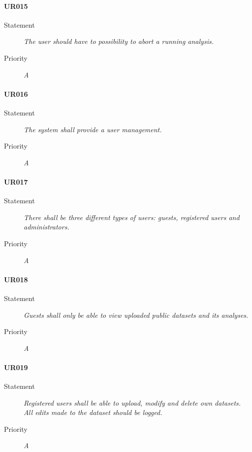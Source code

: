 \paragraph{UR015}
\begin{description}
    \item[Statement]
        \textit{The user should have to possibility to abort a running analysis.}
    \item [Priority] \textit{A}
\end{description}

\paragraph{UR016}
\begin{description}
    \item[Statement]
        \textit{The system shall provide a user management.}
    \item [Priority] \textit{A}
\end{description}

\paragraph{UR017}
\begin{description}
    \item[Statement]
        \textit{There shall be three different types of users: guests, registered users and administrators.}
    \item [Priority] \textit{A}
\end{description}

\paragraph{UR018}
\begin{description}
    \item[Statement]
        \textit{Guests shall only be able to view uploaded public datasets and its analyses.}
    \item [Priority] \textit{A}
\end{description}

\paragraph{UR019}
\begin{description}
    \item[Statement]
        \textit{Registered users shall be able to upload, modify and delete own datasets. All edits made to the dataset should be logged.}
    \item [Priority] \textit{A}
\end{description}

